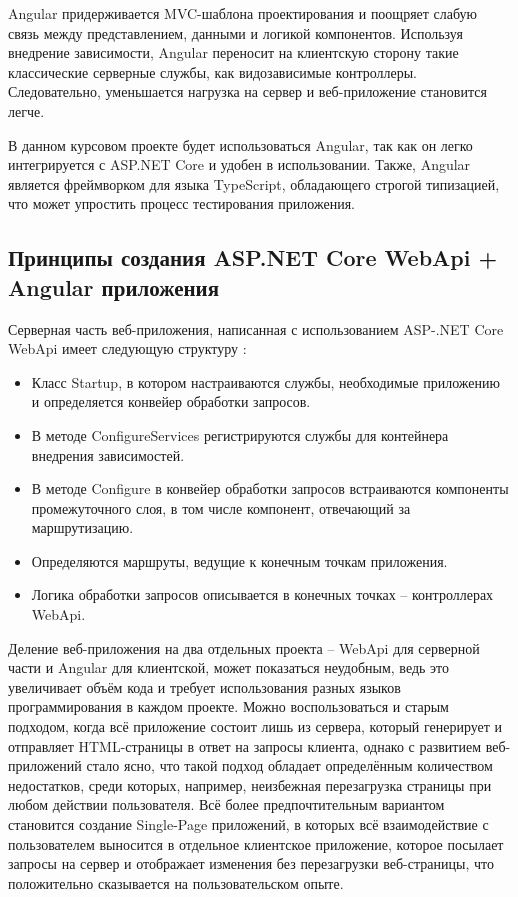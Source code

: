 Angular придерживается MVC-шаблона проектирования и поощряет слабую связь между представлением, данными и логикой компонентов. Используя внедрение зависимости, Angular переносит на клиентскую сторону такие классические серверные службы, как видозависимые контроллеры. Следовательно, уменьшается нагрузка на сервер и веб-приложение становится легче.

В данном курсовом проекте будет использоваться Angular, так как он легко интегрируется с ASP.NET Core и удобен в использовании. Также, Angular является фреймворком для языка TypeScript, обладающего строгой типизацией, что может упростить процесс тестирования приложения.

\subsection{Принципы создания ASP.NET Core WebApi + Angular приложения}
Серверная часть веб-приложения, написанная с использованием ASP-.NET Core WebApi имеет следующую структуру \cite{freeman_ProAsp}:
\begin{itemize}
	\item Класс Startup, в котором настраиваются службы, необходимые приложению и определяется конвейер обработки запросов.
	\item В методе ConfigureServices регистрируются службы для контейнера внедрения зависимостей.
	\item В методе Configure в конвейер обработки запросов встраиваются компоненты промежуточного слоя, в том числе компонент, отвечающий за маршрутизацию.
	\item Определяются маршруты, ведущие к конечным точкам приложения.
	\item Логика обработки запросов описывается в конечных точках -- контроллерах WebApi.
\end{itemize}

Деление веб-приложения на два отдельных проекта -- WebApi для серверной части и Angular для клиентской, может показаться неудобным, ведь это увеличивает объём кода и требует использования разных языков программирования в каждом проекте. Можно воспользоваться и старым подходом, когда всё приложение состоит лишь из сервера, который генерирует и отправляет HTML-страницы в ответ на запросы клиента, однако с развитием веб-приложений стало ясно, что такой подход обладает определённым количеством недостатков, среди которых, например, неизбежная перезагрузка страницы при любом действии пользователя. Всё более предпочтительным вариантом становится создание Single-Page приложений, в которых всё взаимодействие с пользователем выносится в отдельное клиентское приложение, которое посылает запросы на сервер и отображает изменения без перезагрузки веб-страницы, что положительно сказывается на пользовательском опыте.

